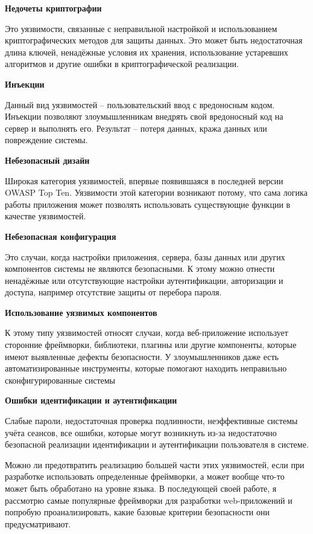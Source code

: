 \textbf{Недочеты криптографии}

Это уязвимости, связанные с неправильной настройкой и использованием криптографических методов 
для защиты данных. Это может быть недостаточная длина ключей, ненадёжные условия их хранения, использование устаревших 
алгоритмов и другие ошибки в криптографической реализации.

\textbf{Инъекции}

Данный вид уязвимостей -- пользовательский ввод с вредоносным кодом. Инъекции позволяют злоумышленникам внедрять свой вредоносный код 
на сервер и выполнять его. Результат -- потеря данных, кража данных или повреждение системы.

\textbf{Небезопасный дизайн}

Широкая категория уязвимостей, впервые появившаяся в последней версии OWASP Top Ten. Уязвимости этой категории возникают 
потому, что сама логика работы приложения может позволять использовать существующие функции в качестве уязвимостей.

\textbf{Небезопасная конфигурация} 

Это случаи, когда настройки приложения, сервера, базы данных или других компонентов системы 
не являются безопасными. К этому можно отнести ненадёжные или отсутствующие настройки аутентификации, 
авторизации и доступа, например отсутствие защиты от перебора пароля.

\textbf{Использование уязвимых компонентов}

К этому типу уязвимостей относят случаи, когда веб-приложение использует сторонние фреймворки, библиотеки, плагины или 
другие компоненты, которые имеют выявленные дефекты безопасности. У злоумышленников даже есть автоматизированные инструменты,
которые помогают находить неправильно сконфигурированные системы


\textbf{Ошибки идентификации и аутентификации}

Слабые пароли, недостаточная проверка подлинности, неэффективные системы учёта сеансов, все ошибки, которые могут возникнуть
из-за недостаточно безопасной реализации идентификации и аутентификации пользователя в системе.
   
\vspace{2mm}
Можно ли предотвратить реализацию большей части этих уязвимостей, если при разработке использовать определенные фреймворки, а может 
вообще что-то может быть обработано на уровне языка. В последующей своей работе, я рассмотрю самые популярные фреймворки для разработки
web-приложений и попробую проанализировать, какие базовые критерии безопасности они предусматривают. 